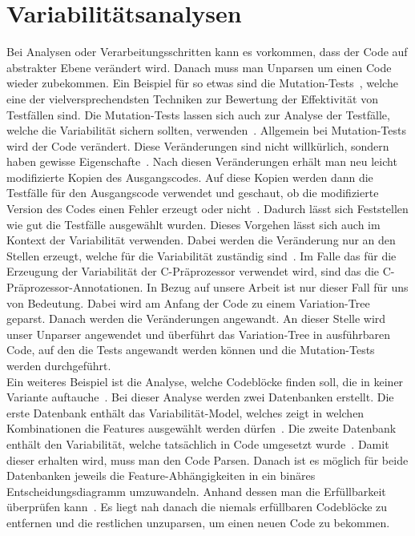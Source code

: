 \section{Variabilitätsanalysen}
Bei Analysen oder Verarbeitungsschritten kann es vorkommen, dass der Code auf abstrakter Ebene verändert wird. Danach muss man Unparsen um einen Code wieder zubekommen. Ein Beispiel für so etwas sind die Mutation-Tests~\cite{ABT+:VaMoS16,LS:SPLat14}, welche eine der vielversprechendsten Techniken zur Bewertung der Effektivität von Testfällen sind. Die Mutation-Tests lassen sich auch zur Analyse der Testfälle, welche die Variabilität sichern sollten, verwenden~\cite{ABT+:VaMoS16,LS:SPLat14}. Allgemein bei Mutation-Tests wird der Code verändert. Diese Veränderungen sind nicht willkürlich, sondern haben gewisse Eigenschafte~\cite{ABT+:VaMoS16,LS:SPLat14}. Nach diesen Veränderungen erhält man neu leicht modifizierte Kopien des Ausgangscodes. Auf diese Kopien werden dann die Testfälle für den Ausgangscode verwendet und geschaut, ob die modifizierte Version des Codes einen Fehler erzeugt oder nicht~\cite{ABT+:VaMoS16,LS:SPLat14}. Dadurch lässt sich Feststellen wie gut die Testfälle ausgewählt wurden. Dieses Vorgehen lässt sich auch im Kontext der Variabilität verwenden. Dabei werden die Veränderung nur an den Stellen erzeugt, welche für die Variabilität zuständig sind~\cite{ABT+:VaMoS16,LS:SPLat14}. Im Falle das für die Erzeugung der Variabilität der C-Präprozessor verwendet wird, sind das die C-Präprozessor-Annotationen. In Bezug auf unsere Arbeit ist nur dieser Fall für uns von Bedeutung. Dabei wird am Anfang der Code zu einem Variation-Tree geparst. Danach werden die Veränderungen angewandt. An dieser Stelle wird unser Unparser angewendet und überführt das Variation-Tree in ausführbaren Code, auf den die Tests angewandt werden können und die Mutation-Tests werden durchgeführt. \\

Ein weiteres Beispiel ist die Analyse, welche Codeblöcke finden soll, die in keiner Variante auftauche~\cite{TSS+:FOSD09}. Bei dieser Analyse werden zwei Datenbanken erstellt. Die erste Datenbank enthält das Variabilität-Model, welches zeigt in welchen Kombinationen die Features ausgewählt werden dürfen~\cite{TSS+:FOSD09}. Die zweite Datenbank enthält den Variabilität, welche tatsächlich in Code umgesetzt wurde~\cite{TSS+:FOSD09}. Damit dieser erhalten wird, muss man den Code Parsen. Danach ist es möglich für beide Datenbanken jeweils die Feature-Abhängigkeiten in ein binäres Entscheidungsdiagramm umzuwandeln. Anhand dessen man die Erfüllbarkeit überprüfen kann~\cite{TSS+:FOSD09}. Es liegt nah danach die niemals erfüllbaren Codeblöcke zu entfernen und die restlichen unzuparsen, um einen neuen Code zu bekommen.\\

